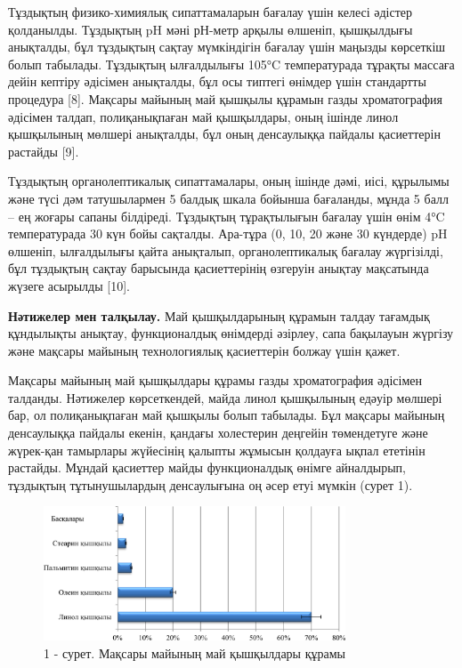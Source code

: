 \begin{multicols}{2}
Тұздықтың физико-химиялық сипаттамаларын бағалау үшін келесі әдістер
қолданылды. Тұздықтың pH мәні рН-метр арқылы өлшеніп, қышқылдығы
анықталды, бұл тұздықтың сақтау мүмкіндігін бағалау үшін маңызды
көрсеткіш болып табылады. Тұздықтың ылғалдылығы 105°C температурада
тұрақты массаға дейін кептіру әдісімен анықталды, бұл осы типтегі
өнімдер үшін стандартты процедура {[}8{]}. Мақсары майының май қышқылы
құрамын газды хроматография әдісімен талдап, полиқанықпаған май
қышқылдары, оның ішінде линол қышқылының мөлшері анықталды, бұл оның
денсаулыққа пайдалы қасиеттерін растайды {[}9{]}.

Тұздықтың органолептикалық сипаттамалары, оның ішінде дәмі, иісі,
құрылымы және түсі дәм татушылармен 5 балдық шкала бойынша бағаланды,
мұнда 5 балл -- ең жоғары сапаны білдіреді. Тұздықтың тұрақтылығын
бағалау үшін өнім 4°C температурада 30 күн бойы сақталды. Ара-тұра (0,
10, 20 және 30 күндерде) pH өлшеніп, ылғалдылығы қайта анықталып,
органолептикалық бағалау жүргізілді, бұл тұздықтың сақтау барысында
қасиеттерінің өзгеруін анықтау мақсатында жүзеге асырылды {[}10{]}.

{\bfseries Нәтижелер мен талқылау.} Май қышқылдарының құрамын талдау
тағамдық құндылықты анықтау, функционалдық өнімдерді әзірлеу, сапа
бақылауын жүргізу және мақсары майының технологиялық қасиеттерін болжау
үшін қажет.

Мақсары майының май қышқылдары құрамы газды хроматография әдісімен
талданды. Нәтижелер көрсеткендей, майда линол қышқылының едәуір мөлшері
бар, ол полиқанықпаған май қышқылы болып табылады. Бұл мақсары майының
денсаулыққа пайдалы екенін, қандағы холестерин деңгейін төмендетуге және
жүрек-қан тамырлары жүйесінің қалыпты жұмысын қолдауға ықпал ететінін
растайды. Мұндай қасиеттер майды функционалдық өнімге айналдырып,
тұздықтың тұтынушылардың денсаулығына оң әсер етуі мүмкін (сурет 1).
\end{multicols}

\begin{figure}[H]
	\centering
	\includegraphics[width=0.8\textwidth]{media/pish/Graph_10}
	\caption*{1 - сурет. Мақсары майының май қышқылдары құрамы}
\end{figure}

